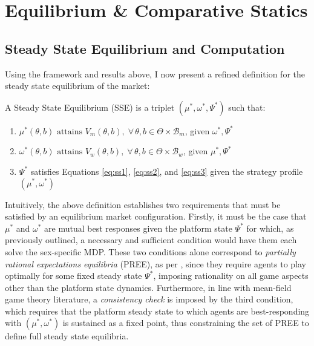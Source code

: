\section{Equilibrium \& Comparative Statics}
\label{sec:section3} 
\subsection{Steady State Equilibrium and Computation}\label{sec:section3.1} 
Using the framework and results above, I now present a refined definition for the steady state equilibrium of the market: 
\begin{definition}
    A Steady State Equilibrium (SSE) is a triplet $(\mu^*, \omega^*, \Psi^*)$ such that:
    \begin{enumerate}
        \item $ \mu^*(\theta,b) \text{ attains } V_m(\theta,b), \; \forall\, \theta, b \in \Theta \times \mathcal{B}_m$, given $\omega^*,\Psi^*$
        \item $ \omega^*(\theta,b) \text{ attains } V_w(\theta,b), \; \forall\, \theta, b \in \Theta \times \mathcal{B}_w$, given $\mu^*,\Psi^*$
        \item $\Psi^*$ satisfies Equations \ref{eq:ss1}, \ref{eq:ss2}, and \ref{eq:ss3} given the strategy profile $(\mu^*, \omega^*)$
    \end{enumerate} 
\end{definition}

Intuitively, the above definition establishes two requirements that must be satisfied by an equilibrium market configuration. 
Firstly, it must be the case that $\mu^*$ and $\omega^*$ are mutual best responses given the platform state $\Psi^*$ for which, as previously outlined, a necessary and sufficient condition would have them each solve the sex-specific MDP. 
These two conditions alone correspond to \textit{partially rational expectations equilibria} (PREE), as per \cite{burdett1997marriage}, since they require agents to play optimally for some fixed steady state $\Psi^*$, imposing rationality on all game aspects other than the platform state dynamics.  
Furthermore, in line with mean-field game theory literature, a \textit{consistency check} is imposed by the third condition, which requires that the platform steady state to which agents are best-responding with $(\mu^*,\omega^*)$ is sustained as a fixed point, thus constraining the set of PREE to define full steady state equilibria. 

